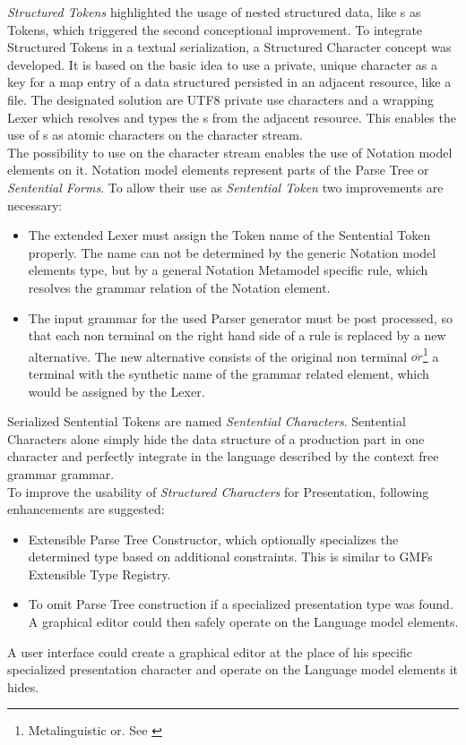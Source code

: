 \emph{Structured Tokens} highlighted the usage of nested structured data, like s as Tokens, which triggered the second conceptional improvement. To integrate Structured Tokens in a textual serialization, a Structured Character concept was developed. It is based on the basic idea to use a private, unique character as a key for a map entry of a data structured persisted in an adjacent resource, like a file. The designated solution are UTF8 private use characters and a wrapping Lexer which resolves and types the s from the adjacent resource. This enables the use of s as atomic characters on the character stream. \\

The possibility to use  on the character stream enables the use of Notation model elements on it. Notation model elements represent parts of the Parse Tree or \emph{Sentential Forms}. To allow their use as \emph{Sentential Token} two improvements are necessary:
\begin{itemize}
	\item The extended Lexer must assign the Token name of the Sentential Token properly. The name can not be determined by the generic Notation model elements type, but by a general Notation Metamodel specific rule, which resolves the grammar relation of the Notation element.
	\item The input grammar for the used Parser generator must be post processed, so that each non terminal on the right hand side of a rule is replaced by a new alternative. The new alternative consists of the original non terminal $\overline{or}$\footnote{\raggedright Metalinguistic or. See \cite{BNF}} a terminal with the synthetic name of the grammar related element, which would be assigned by the Lexer.
\end{itemize}
Serialized Sentential Tokens are named \emph{Sentential Characters}. Sentential Characters alone simply hide the data structure of a production part in one character and perfectly integrate in the language described by the context free grammar grammar. \\

To improve the usability of \emph{Structured Characters} for Presentation, following enhancements are suggested:
\begin{itemize}
	\item Extensible Parse Tree Constructor, which optionally specializes the determined type based on additional constraints. This is similar to GMFs Extensible Type Registry.
	\item To omit Parse Tree construction if a specialized presentation type was found. A graphical editor could then safely operate on the Language model elements.
\end{itemize}
A user interface could create a graphical editor at the place of his specific specialized presentation character and operate on the Language model elements it hides.\\


